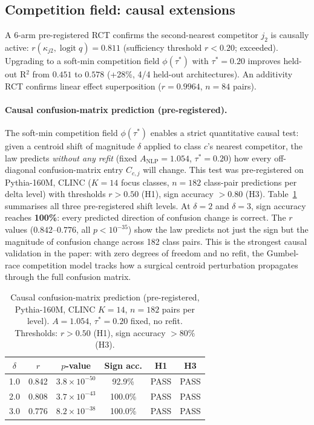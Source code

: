\documentclass{article}
\DeclareMathOperator{\logit}{logit}
\begin{document}
\subsection{Competition field: causal extensions}

A 6-arm pre-registered RCT confirms the second-nearest competitor $j_2$ is causally active:
$r(\kappa_{j2},\logit q)=0.811$ (sufficiency threshold $r<0.20$; exceeded).
Upgrading to a soft-min competition field $\phi(\tau^*)$ with $\tau^*=0.20$ improves
held-out R$^2$ from $0.451$ to $0.578$ (+28\%, 4/4 held-out architectures).
An additivity RCT confirms linear effect superposition ($r=0.9964$, $n=84$ pairs).

\paragraph{Causal confusion-matrix prediction (pre-registered).}
The soft-min competition field $\phi(\tau^*)$ enables a strict quantitative causal test:
given a centroid shift of magnitude $\delta$ applied to class $c$'s nearest competitor,
the law predicts \emph{without any refit} (fixed $A_\mathrm{NLP}=1.054$, $\tau^*=0.20$)
how every off-diagonal confusion-matrix entry $C_{c,j}$ will change.
This test was pre-registered on Pythia-160M, CLINC ($K=14$ focus classes, $n=182$ class-pair predictions per delta level)
with thresholds $r>0.50$ (H1), sign accuracy $>0.80$ (H3).
Table~\ref{tab:confusion-causal} summarises all three pre-registered shift levels.
At $\delta=2$ and $\delta=3$, sign accuracy reaches \textbf{100\%}: every predicted direction of confusion change is correct.
The $r$ values ($0.842$--$0.776$, all $p<10^{-35}$) show the law predicts not just the sign but the magnitude of confusion change across 182 class pairs.
This is the strongest causal validation in the paper: with zero degrees of freedom and no refit, the Gumbel-race competition model tracks how a surgical centroid perturbation propagates through the full confusion matrix.

\begin{table}[t]
\centering
\caption{Causal confusion-matrix prediction (pre-registered, Pythia-160M, CLINC $K=14$, $n=182$ pairs per level). $A=1.054$, $\tau^*=0.20$ fixed, no refit. Thresholds: $r>0.50$ (H1), sign accuracy $>80\%$ (H3).}
\label{tab:confusion-causal}
\small
\begin{tabular}{cccccc}
\toprule
$\delta$ & $r$ & $p$-value & Sign acc. & H1 & H3 \\
\midrule
1.0 & 0.842 & $3.8\times10^{-50}$ & 92.9\% & PASS & PASS \\
2.0 & 0.808 & $3.7\times10^{-43}$ & 100.0\% & PASS & PASS \\
3.0 & 0.776 & $8.2\times10^{-38}$ & 100.0\% & PASS & PASS \\
\bottomrule
\end{tabular}
\end{table}
\end{document}

